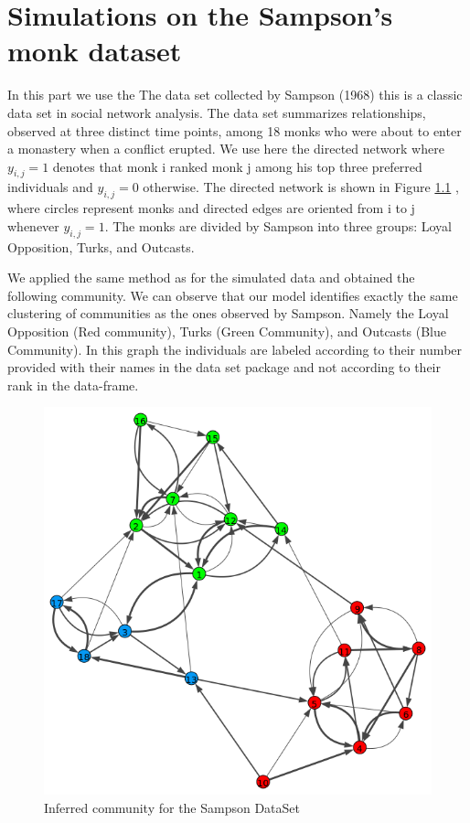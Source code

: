 \documentclass[12pt]{ociamthesis}  %
\begin{document}
	
	
	
	\chapter{Simulations on the Sampson’s monk dataset}
	In this part we use the The data set collected by Sampson (1968) this is a classic data set in social network analysis. The data set summarizes relationships, observed at three distinct time points, among 18 monks who were about to enter a monastery when a conflict erupted. We use here the directed network where $y_{i,j} = 1$ denotes that monk i ranked monk j among his top three preferred individuals and $y_{i,j} = 0$ otherwise. The directed network is shown in Figure \ref{label-image4} , where circles represent monks and directed edges are oriented from i to j whenever $y_{i,j} = 1$. The monks are divided by Sampson into three groups: Loyal Opposition, Turks, and Outcasts.
	
	We applied the same method as for the simulated data and obtained the following community. We can observe that our model identifies exactly the same clustering of communities as the ones observed by Sampson. Namely the Loyal Opposition (Red community), Turks (Green Community), and Outcasts (Blue Community). In this graph the individuals are labeled according to their number provided with their names in the data set package and not according to their rank in the data-frame.
	
	
	\begin{figure}
		\centering
		\includegraphics[width=\textwidth,height=\textheight,keepaspectratio]{OptimizationPlotSam}
		\caption{Inferred community for the Sampson DataSet}
		\label{label-image4}
	\end{figure}
	
	
	
\end{document}
